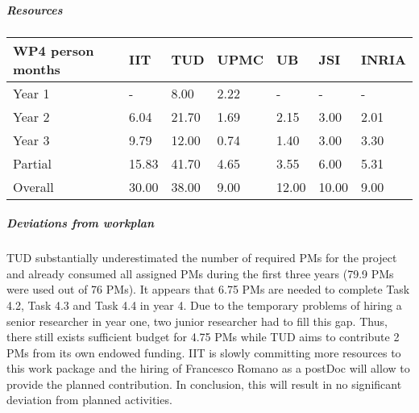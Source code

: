 
\subparagraph*{Resources}

\begin{center}
\begin{tabular}{|C{1.5cm}|C{1.5cm}|C{1.5cm}|C{2cm}|C{2cm}|C{2cm}|C{2cm}|}
\hline
\footnotesize \textbf{WP4 person months}& \footnotesize \textbf{IIT}&\footnotesize \textbf{TUD}&\footnotesize \textbf{UPMC}& \footnotesize \textbf{UB} &\footnotesize \textbf{JSI} &\footnotesize \textbf{INRIA}\\ \hline
\footnotesize Year 1  &  -  & 8.00 & 2.22 & - & - & -     \\  \hline
\footnotesize Year 2  &  6.04  & 21.70 & 1.69 & 2.15 & 3.00 & 2.01     \\  \hline
\footnotesize Year 3  &  9.79 & 12.00 & 0.74 & 1.40 & 3.00 & 3.30 \\  \hline
\footnotesize Partial &  15.83 & 41.70 & 4.65 & 3.55 & 6.00 & 5.31 \\ 
\hline \hline
\footnotesize Overall &  30.00 & 38.00 & 9.00 & 12.00 & 10.00 & 9.00 \\ \hline
\end{tabular}
\end{center}

\subparagraph*{Deviations from workplan} 
TUD substantially underestimated the number of required PMs for the project and already consumed all assigned PMs during the first three years (79.9 PMs were used out of 76 PMs). It appears that 6.75 PMs are needed to complete Task 4.2, Task 4.3 and Task 4.4 in year 4. Due to the temporary problems of hiring a senior researcher in year one, two junior researcher had to fill this gap. Thus, there still exists sufficient budget for 4.75 PMs while TUD aims to contribute 2 PMs from its own endowed funding. IIT is slowly committing more resources to this work package and the hiring of Francesco Romano as a postDoc will allow to provide the planned contribution. In conclusion, this will result in no significant deviation from planned activities.

